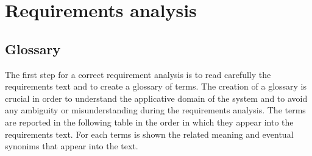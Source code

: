 \documentclass[a4paper]{article}
\begin{document}
\section{Requirements analysis }

\subsection {Glossary}

The first step for a correct requirement analysis is to read carefully the requirements text and to create a glossary of terms. The creation of a glossary is crucial in order to understand the applicative domain of the system and to avoid any ambiguity or misunderstanding during the requirements analysis. \newline\newline
The terms are reported in the following table in the order in which they appear into the requirements text. For each terms is shown the related meaning and eventual synonims that appear into the text. \hfill \break
\end{document}
